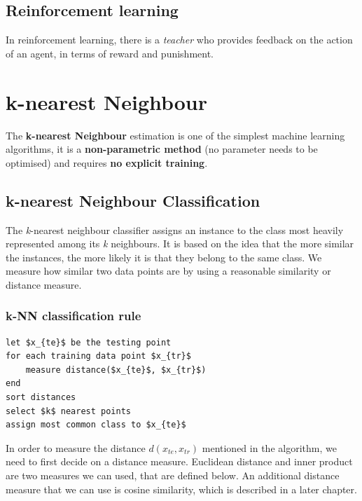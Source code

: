 \documentclass[11pt,fleqn]{book} %
\begin{document}
\section{Reinforcement learning}
In reinforcement learning, there is a \textit{teacher} who provides feedback on the action of an agent, in terms of reward and punishment.


\chapter{k-nearest Neighbour}
The \textbf{k-nearest Neighbour} estimation is one of the simplest machine learning algorithms, it is a \textbf{non-parametric method} (no parameter needs to be optimised) and requires \textbf{no explicit training}.

\section{k-nearest Neighbour Classification}
The \textit{k}-nearest neighbour classifier assigns an instance to the class most heavily represented among its \textit{k} neighbours. It is based on the idea that the more similar the instances, the more likely it is that they belong to the same class. We measure how similar two data points are by using a reasonable similarity or distance measure.

\subsection{k-NN classification rule}
\begin{lstlisting}[mathescape]
let $x_{te}$ be the testing point
for each training data point $x_{tr}$
    measure distance($x_{te}$, $x_{tr}$)
end
sort distances
select $k$ nearest points
assign most common class to $x_{te}$	
\end{lstlisting}

\noindent
In order to measure the distance $d(x_{te}, x_{tr})$ mentioned in the algorithm, we need to first decide on a distance measure. Euclidean distance and inner product are two measures we can used, that are defined below. An additional distance measure that we can use is cosine similarity, which is described in a later chapter.\\
\end{document}
